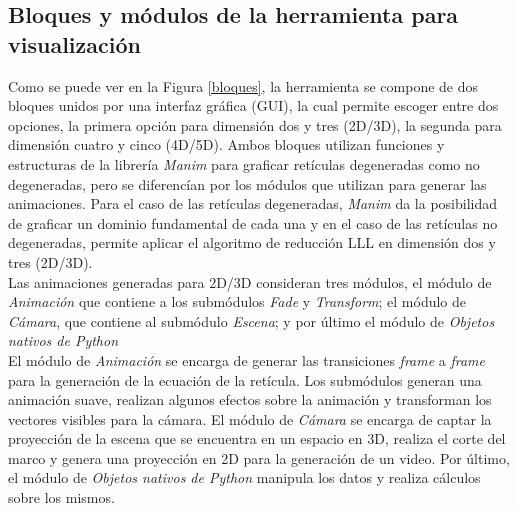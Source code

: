 \documentclass{llncs}
\begin{document}
\subsection{Bloques y módulos de la herramienta para visualización}
Como se puede ver en la Figura \ref{bloques}, la herramienta se compone de dos bloques unidos por una interfaz gráfica (GUI), la cual permite escoger entre dos opciones, la primera opción para dimensión dos y tres (2D/3D), la segunda para dimensión cuatro y cinco (4D/5D). Ambos bloques utilizan funciones y estructuras de la librería \textit{Manim} \cite{b16} para graficar ret\'iculas degeneradas como no degeneradas, pero se diferencían por los módulos que utilizan para generar las animaciones. Para el caso de las retículas degeneradas, \textit{Manim} da la posibilidad de graficar un dominio fundamental de cada una y en el caso de las ret\'iculas no degeneradas, permite aplicar el algoritmo de reducci\'on LLL en dimensi\'on dos y tres (2D/3D). %
\\
Las animaciones generadas para 2D/3D consideran tres módulos, el módulo de \textit{Animación} que contiene a los submódulos \textit{Fade} y \textit{Transform}; el módulo de \textit{Cámara}, que contiene al submódulo \textit{Escena}; y por último el módulo de \textit{Objetos nativos de Python}\\
El módulo de \textit{Animaci\'on} se encarga de generar las transiciones \textit{frame} a \textit{frame} para la generaci\'on de la ecuaci\'on de la ret\'icula. Los submódulos generan una animaci\'on suave, realizan algunos efectos sobre la animaci\'on y transforman los vectores visibles para la c\'amara. El módulo de \textit{C\'amara} se encarga de captar la proyecci\'on de la escena que se encuentra en un espacio en 3D, realiza el corte del marco y genera una proyecci\'on en 2D para la generación de un video. Por último, el módulo de \textit{Objetos nativos de Python} manipula los datos y realiza c\'alculos sobre los mismos.\\
\end{document}
